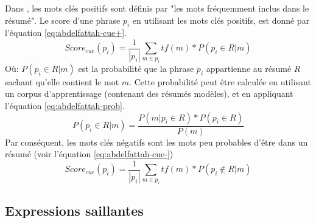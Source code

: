 \documentclass[a4paper,12pt,oneside]{../use/ESIthesis}
\begin{document}
Dans \cite{09-abdelfattah-ren}, les mots clés positifs sont définis par "les mots fréquemment inclus dans le résumé". 
Le score d'une phrase $ p_i $ en utilisant les mots clés positifs, est donné par l'équation \ref{eq:abdelfattah-cue+}. 
\begin{equation}
\label{eq:abdelfattah-cue+}
Score_{cue}(p_i) = \frac{1}{|p_i|} \sum_{m \in p_i}{tf(m) * P(p_i \in R | m)}
\end{equation}
Où: 
$ P(p_i \in R | m) $ est la probabilité que la phrase $ p_i $ appartienne au résumé $ R $ sachant qu'elle contient le mot $ m $. 
Cette probabilité peut être calculée en utilisant un corpus d'apprentissage (contenant des résumés modèles), et en appliquant l'équation \ref{eq:abdelfattah-prob}. 
\begin{equation}
\label{eq:abdelfattah-prob}
P(p_i \in R | m) = \frac{P(m | p_i \in R) * P(p_i \in R)}{P(m)}
\end{equation}
Par conséquent, les mots clés négatifs sont les mots peu probables d'être dans un résumé (voir l'équation \ref{eq:abdelfattah-cue-})
\begin{equation}
\label{eq:abdelfattah-cue-}
Score_{cue}(p_i) = \frac{1}{|p_i|} \sum_{m \in p_i}{tf(m) * P(p_i \notin R | m)}
\end{equation}

\subsection{Expressions saillantes}
\end{document}
